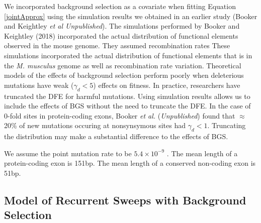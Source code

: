 \documentclass[11pt]{article}
\begin{document}
	
 	We incorporated background selection as a covariate when fitting Equation \ref{jointApprox} using the simulation results we obtained in an earlier study (Booker and Keightley \textit{et al Unpublished}). The simulations performed by Booker and Keightley (2018) incorporated the actual distribution of functional elements observed in the mouse genome. They assumed recombination rates 
 	These simulations incorporated the actual distribution of functional elements that is in the \textit{M. musculus} genome as well as recombination rate variation. Theoretical models of the effects of background selection perform poorly when deleterious mutations have weak ($\gamma_d < 5$) 	effects on fitness. In practice, researchers have truncated the DFE for harmful mutations. Using simulation results allows us to include the effects of BGS without the need to truncate the DFE. In the case of 0-fold sites in protein-coding exons, Booker \textit{et al.} (\textit{Unpublished}) found that $\approx$ 20\% of new mutations occuring at nonsynsymous sites had $\gamma_d < 1$. Truncating the distribution may make a substantial difference to the effects of BGS. 
 	
	We assume the point mutation rate to be $5.4 \times 10^{-9}$ \citep{RN228}.
 	The mean length of a protein-coding exon is 151bp.
 	The mean length of a conserved non-coding exon is 51bp.
 	
	\subsection*{Model of Recurrent Sweeps with Background Selection}
\end{document}
